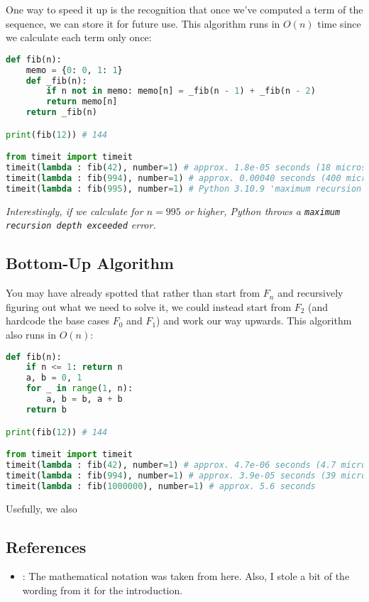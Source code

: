 One way to speed it up is the recognition that once we've computed a term of the sequence, we can store it for future use. This algorithm runs in $O(n)$ time since we calculate each term only once:
\begin{lstlisting}[language={python}, caption={Python code for a memoized recursion algorithm.}]
def fib(n):
    memo = {0: 0, 1: 1}
    def _fib(n):
        if n not in memo: memo[n] = _fib(n - 1) + _fib(n - 2)
        return memo[n]
    return _fib(n)

print(fib(12)) # 144

from timeit import timeit
timeit(lambda : fib(42), number=1) # approx. 1.8e-05 seconds (18 microseconds)
timeit(lambda : fib(994), number=1) # approx. 0.00040 seconds (400 microseconds)
timeit(lambda : fib(995), number=1) # Python 3.10.9 'maximum recursion depth exceeded' error
\end{lstlisting}

\emph{Interestingly, if we calculate for $n = 995$ or higher, Python throws a \texttt{maximum recursion depth exceeded} error.}


\subsection{Bottom-Up Algorithm}

You may have already spotted that rather than start from $F_n$ and recursively figuring out what we need to solve it, we could instead start from $F_2$ (and hardcode the base cases $F_0$ and $F_1$) and work our way upwards. This algorithm also runs in $O(n)$:
\begin{lstlisting}[language={python}, caption={Python code for a bottom-up algorithm.}]
def fib(n):
    if n <= 1: return n
    a, b = 0, 1
    for _ in range(1, n):
        a, b = b, a + b
    return b

print(fib(12)) # 144

from timeit import timeit
timeit(lambda : fib(42), number=1) # approx. 4.7e-06 seconds (4.7 microseconds)
timeit(lambda : fib(994), number=1) # approx. 3.9e-05 seconds (39 microseconds)
timeit(lambda : fib(1000000), number=1) # approx. 5.6 seconds
\end{lstlisting}

Usefully, we also 


\subsection{References}
\begin{itemize}
    \item \href{https://en.wikipedia.org/wiki/Fibonacci_sequence}{}: The mathematical notation was taken from here. Also, I stole a bit of the wording from it for the introduction.
\end{itemize}

